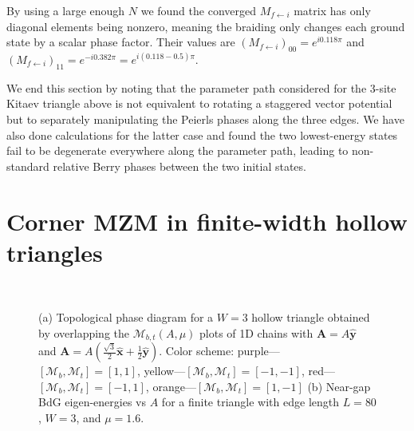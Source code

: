 \documentclass[aps,prb,showpacs,amsmath,amssymb,superscriptaddress]{revtex4-2}
\let\oldhat\hat
\renewcommand{\hat}[1]{\oldhat{\mathbf{#1}}}
\begin{document}
By using a large enough $N$ we found the converged $M_{f\leftarrow i}$ matrix has only diagonal elements being nonzero, meaning the braiding only changes each ground state by a scalar phase factor. Their values are $(M_{f\leftarrow i})_{00} = e^{i0.118\pi}$ and $(M_{f\leftarrow i})_{11} = e^{-i 0.382\pi} = e^{i(0.118-0.5)\pi}$.

We end this section by noting that the parameter path considered for the 3-site Kitaev triangle above is not equivalent to rotating a staggered vector potential but to separately manipulating the Peierls phases along the three edges. We have also done calculations for the latter case and found the two lowest-energy states fail to be degenerate everywhere along the parameter path, leading to non-standard relative Berry phases between the two initial states.

\section{Corner MZM in finite-width hollow triangles}

\begin{figure}[ht]
 \hspace{43pt}
   \\
  \vspace{-20pt}
  \caption{(a) Topological phase diagram for a $W=3$ hollow triangle obtained by overlapping the $\mathcal{M}_{b,t}(A, \mu)$ plots of 1D chains with $\mathbf A = A\hat{y}$ and $\mathbf A = A(\frac{\sqrt{3}}{2}\hat{x}+\frac{1}{2}\hat{y})$. Color scheme: purple---$[\mathcal{M}_b,\mathcal{M}_t]=[1,1]$, yellow---$[\mathcal{M}_b,\mathcal{M}_t]=[-1,-1]$, red---$[\mathcal{M}_b,\mathcal{M}_t]=[-1,1]$, orange---$[\mathcal{M}_b,\mathcal{M}_t] = [1,-1]$ (b) Near-gap BdG eigen-energies vs $A$ for a finite triangle with edge length $L=80$, $W=3$, and $\mu=1.6$.}
  \label{fig: supp pd}
\end{figure}
\end{document}
